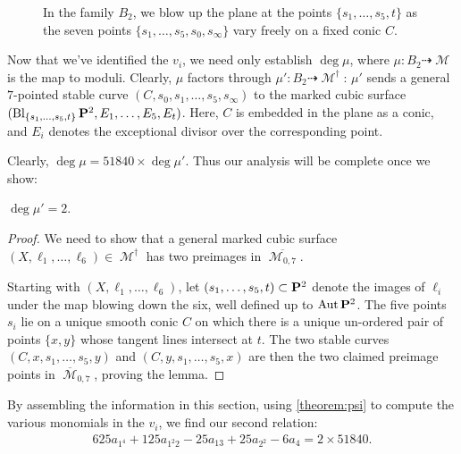 \documentclass[12pt,reqno]{amsart}
\DeclareMathOperator{\Bl}{Bl}
\DeclareMathOperator{\M}{\mathcal{M}}
\numberwithin{equation}{section}
\renewcommand {\o}[1]{\overline{#1}}
\begin{document}
\begin{figure}[!]
    \centering
    
    \caption{
      In the family $B_2$, we blow up the plane at the points $\{s_{1}, \dots, s_{5}, t\}$ as the seven points $\{s_1, \dots, s_5, s_0, s_\infty\}$ vary freely on a fixed conic $C$.}
    \label{fig:FamilyB2}
     \end{figure}


Now that we've identified the $v_{i}$, we need only establish
$\deg \mu$, where $\mu: B_{2} \dashrightarrow \M$ is the map to
moduli.  Clearly, $\mu$ factors through
$\mu':B_{2} \dashrightarrow \M^{\dagger}$: $\mu'$ sends a general
$7$-pointed stable curve $(C,s_0,s_1, \dots, s_5, s_{\infty})$ to the
marked cubic surface
$(\Bl_{\{s_1, \dots, s_{5}, t\}}\P^{2}, E_1, \dots, E_5, E_t)$. Here,
$C$ is embedded in the plane as a conic, and $E_i$ denotes the
exceptional divisor over the corresponding point.

Clearly, $\deg \mu = 51840 \times \deg \mu'$.  Thus our analysis will
be complete once we show:

\begin{lemma}
  \label{lemma:muprime2} $\deg \mu' = 2.$
\end{lemma}

\begin{proof}
  We need to show that a general marked cubic surface
  $(X, \ell_{1}, \dots, \ell_{6}) \in \M^{\dagger}$ has two preimages
  in $\o{\M_{0,7}}$.
  
  
  Starting with $(X, \ell_{1}, \dots, \ell_{6})$, let
  $(s_1, \dots, s_5, t) \subset \P^{2}$ denote the images of
  $\ell_{i}$ under the map blowing down the six, well defined up to
  $\Aut \P^{2}$.  The five points $s_{i}$ lie on a unique smooth conic
  $C$ on which there is a unique un-ordered pair of points $\{x,y\}$
  whose tangent lines intersect at $t$.  The two stable curves
  $(C,x,s_1, \dots, s_5, y)$ and $(C,y,s_1, \dots, s_5, x)$ are then
  the two claimed preimage points in $\o{\M}_{0,7}$, proving the
  lemma.
\end{proof}


By assembling the information in this section, using
\autoref{theorem:psi} to compute the various monomials in the $v_{i}$,
we find our second relation:
\begin{align}
  \label{eq:relation2}
  625 a_{1^{4}} + 125 a_{1^{2}2} - 25a_{13} + 25a_{2^2} - 6 a_{4} = 2 \times 51840.
\end{align}

\end{document}
